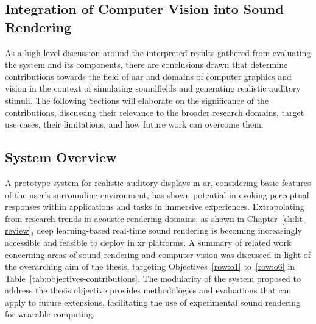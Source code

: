 \subsection{Integration of Computer Vision into Sound Rendering}
As a high-level discussion around the interpreted results gathered from evaluating the system and its components, there are conclusions drawn that determine contributions towards the field of \acrfull{aar} and domains of computer graphics and vision in the context of simulating soundfields and generating realistic auditory stimuli. The following Sections will elaborate on the significance of the contributions, discussing their relevance to the broader research domains, target use cases, their limitations, and how future work can overcome them.

\subsection{System Overview}
A prototype system for realistic auditory displays in \acrshort{ar}, considering basic features of the user's surrounding environment, has shown potential in evoking perceptual responses within applications and tasks in immersive experiences. Extrapolating from research trends in acoustic rendering domains, as shown in Chapter~\ref{ch:lit-review}, deep learning-based real-time sound rendering is becoming increasingly accessible and feasible to deploy in \acrshort{xr} platforms. A summary of related work concerning areas of sound rendering and computer vision was discussed in light of the overarching aim of the thesis, targeting Objectives~\ref{row:o1} to~\ref{row:o6} in Table~\ref{tab:objectives-contributions}.
The modularity of the system proposed to address the thesis objective provides methodologies and evaluations that can apply to future extensions, facilitating the use of experimental sound rendering for wearable computing.

